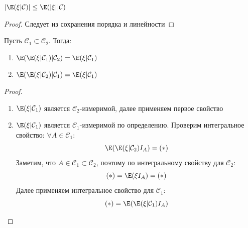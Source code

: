 \begin{proposition}
    \(|\E(\xi|\mathcal{C})| \le \E(|\xi||\mathcal{C})\)
\end{proposition}
\begin{proof}
    Следует из сохранения порядка и линейности
\end{proof}

\begin{proposition}
    Пусть \(\mathcal{C}_1 \subset \mathcal{C}_2\). Тогда:
    \begin{enumerate}
        \item \(\E(\E(\xi|\mathcal{C}_1)|\mathcal{C}_2) = \E(\xi|\mathcal{C}_1)\)
        \item \(\E(\E(\xi|\mathcal{C}_2)|\mathcal{C}_1) = \E(\xi|\mathcal{C}_1)\)
    \end{enumerate}
\end{proposition}
\begin{proof}
    \begin{enumerate}
        \item \(\E(\xi|\mathcal{C}_1)\) является \(\mathcal{C}_2\)-измеримой, далее применяем первое свойство
        \item \(\E(\xi|\mathcal{C}_1)\) является \(\mathcal{C}_1\)-измеримой по определению. Проверим интегральное свойство: \(\forall A \in \mathcal{C}_1\):
        \[\E(\E(\xi|\mathcal{C}_2)I_A) = (*)\]
        Заметим, что \(A \in \mathcal{C}_1 \subset \mathcal{C}_2\), поэтому по интегральному свойству для \(\mathcal{C}_2\):
        \[(*) = \E(\xi I_A) = (*)\]
        Далее применяем интегральное свойство для \(\mathcal{C}_1\):
        \[(*) = \E(\E(\xi|\mathcal{C}_1)I_A)\]
    \end{enumerate}
\end{proof}

